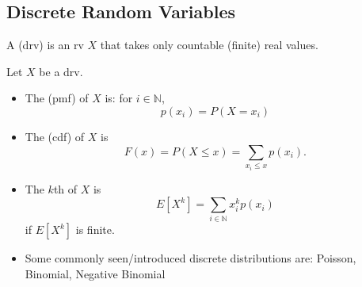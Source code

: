 \documentclass[notoc,notitlepage]{tufte-book}
\begin{document}
\subsection{Discrete Random Variables}%
\label{sub:discrete_random_variables}

\begin{defn}\label{defn:discrete_random_variable}
  A  (drv) is an rv $X$ that takes only countable (finite) real values.
\end{defn}

\begin{note}
  Let $X$ be a drv.
  \begin{itemize}
    \item The  (pmf) of $X$ is: for $i \in \mathbb{N}$,
      \begin{equation*}
        p(x_i) = P(X = x_i)
      \end{equation*}

    \item The  (cdf) of $X$ is
      \begin{equation*}
        F(x) = P(X \leq x) = \sum_{x_i \leq x} p(x_i).
      \end{equation*}

    \item The $k$th  of $X$ is
      \begin{equation*}
        E[X^k] = \sum_{i \in \mathbb{N}} x_i^k p(x_i)
      \end{equation*}
      if $E[X^k]$ is finite.

    \item Some commonly seen/introduced discrete distributions are: Poisson, Binomial, Negative Binomial
  \end{itemize}
\end{note}
\end{document}
